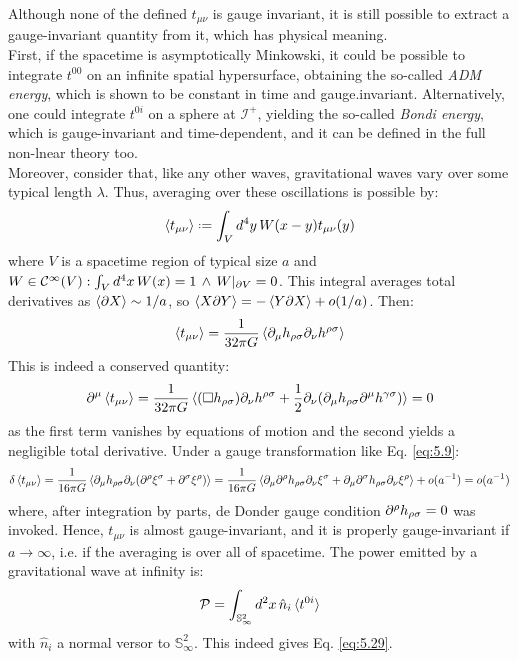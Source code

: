 Although none of the defined $ t_{\mu \nu} $ is gauge invariant, it is still possible to extract a gauge-invariant quantity from it, which has physical meaning.\\
First, if the spacetime is asymptotically Minkowski, it could be possible to integrate $ t^{00} $ on an infinite spatial hypersurface, obtaining the so-called \textit{ADM energy}, which is shown to be constant in time and gauge.invariant. Alternatively, one could integrate $ t^{0i} $ on a sphere at $ \mathcal{I}^+ $, yielding the so-called \textit{Bondi energy}, which is gauge-invariant and time-dependent, and it can be defined in the full non-lnear theory too.\\
Moreover, consider that, like any other waves, gravitational waves vary over some typical length $ \lambda $. Thus, averaging over these oscillations is possible by:
\begin{equation*}
  \braket{t_{\mu \nu}} \defeq \int_V d^4 y\, W(x - y) t_{\mu \nu}(y)
\end{equation*}
where $ V $ is a spacetime region of typical size $ a $ and $ W \in \mathcal{C}^{\infty}(V) : \int_V d^4 x\, W(x) = 1 \,\land\, W\vert_{\partial V} = 0 $. This integral averages total derivatives as $ \braket{\partial X} \sim 1/a $, so $ \braket{X \partial Y} = - \braket{Y \partial X} + o(1/a) $. Then:
\begin{equation}
  \braket{t_{\mu \nu}} = \frac{1}{32\pi G} \braket{\partial_\mu h_{\rho \sigma} \partial_\nu h^{\rho \sigma}}
  \label{eq:5.31}
\end{equation}
This is indeed a conserved quantity:
\begin{equation*}
  \partial^\mu \braket{t_{\mu \nu}} = \frac{1}{32\pi G} \braket{(\Box h_{\rho \sigma}) \partial_\nu h^{\rho \sigma} + \frac{1}{2} \partial_\nu (\partial_\mu h_{\rho \sigma} \partial^\mu h^{\gamma \sigma})} = 0
\end{equation*}
as the first term vanishes by equations of motion and the second yields a negligible total derivative. Under a gauge transformation like Eq. \ref{eq:5.9}:
\begin{equation*}
  \delta \braket{t_{\mu \nu}} = \frac{1}{16\pi G} \braket{\partial_\mu h_{\rho \sigma} \partial_\nu (\partial^\rho \xi^\sigma + \partial^\sigma \xi^\rho)} = \frac{1}{16\pi G} \braket{\partial_\mu \partial^\rho h_{\rho \sigma} \partial_\nu \xi^\sigma + \partial_\mu \partial^\sigma h_{\rho \sigma} \partial_\nu \xi^\rho} + o(a^{-1}) = o(a^{-1})
\end{equation*}
where, after integration by parts, de Donder gauge condition $ \partial^\rho h_{\rho \sigma} = 0 $ was invoked. Hence, $ t_{\mu \nu} $ is almost gauge-invariant, and it is properly gauge-invariant if $ a \rightarrow \infty $, i.e. if the averaging is over all of spacetime. The power emitted by a gravitational wave at infinity is:
\begin{equation*}
  \mathcal{P} = \int_{\mathbb{S}^2_{\infty}} d^2 x\, \hat{n}_i \braket{t^{0i}}
\end{equation*}
with $ \hat{n}_i $ a normal versor to $ \mathbb{S}^2_{\infty} $. This indeed gives Eq. \ref{eq:5.29}.

